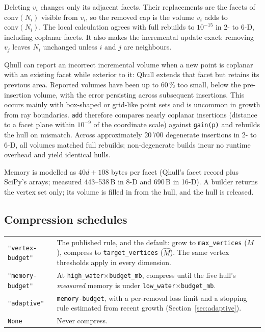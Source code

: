 \documentclass[11pt,a4paper]{report}
\newcommand{\why}[1]{\par\medskip\begingroup\noindent #1\par\endgroup\medskip}
\newcommand{\trap}[1]{\begin{warnbox}#1\end{warnbox}}
\newcommand{\code}[1]{\texttt{\small #1}}
\begin{document}
\why{Deleting $v_i$ changes only its adjacent facets. Their replacements are
the facets of $\mathrm{conv}(N_i)$ visible from $v_i$, so the removed cap is
the volume $v_i$ adds to $\mathrm{conv}(N_i)$. The local calculation agrees
with full rebuilds to
$10^{-15}$ in 2- to 6-D, including coplanar facets. It also makes the
incremental update exact: removing $v_j$ leaves $N_i$ unchanged unless $i$ and
$j$ are neighbours.}

\trap{Qhull can report an incorrect incremental volume when a new point is
coplanar with an existing facet while exterior to it: Qhull extends that facet
but retains its previous area. Reported volumes have been up to 60\,\% too
small, below the pre-insertion volume, with the error persisting across
subsequent insertions. This occurs mainly with box-shaped or grid-like point
sets and is uncommon in growth from ray boundaries. \code{add} therefore
compares nearly coplanar insertions (distance to a facet plane within
$10^{-9}$ of the coordinate scale) against \code{gain(p)} and rebuilds the hull
on mismatch. Across approximately 20\,700 degenerate insertions in 2- to 6-D,
all volumes matched full rebuilds; non-degenerate builds incur no runtime
overhead and yield identical hulls.}

Memory is modelled as $40d+108$ bytes per facet (Qhull's facet record plus
SciPy's arrays; measured 443--538\,B in 8-D and 690\,B in 16-D). A builder
returns the vertex set only; its volume is filled in from the hull, and the hull
is released.

\subsection{Compression schedules}

\begin{center}\small
\begin{tabular}{@{}lp{10.4cm}@{}}
\toprule
\code{"vertex-budget"} & The published rule, and the default: grow to
  \code{max\_vertices} ($M$), compress to \code{target\_vertices} ($\hat M$).
  The same vertex thresholds apply in every dimension. \\
\code{"memory-budget"} & At \code{high\_water}$\times$\code{budget\_mb}, compress
  until the live hull's \emph{measured} memory is under
  \code{low\_water}$\times$\code{budget\_mb}. \\
\code{"adaptive"} & \code{memory-budget}, with a per-removal loss limit and a
  stopping rule estimated from recent growth (Section~\ref{sec:adaptive}). \\
\code{None} & Never compress. \\
\bottomrule
\end{tabular}
\end{center}
\end{document}
